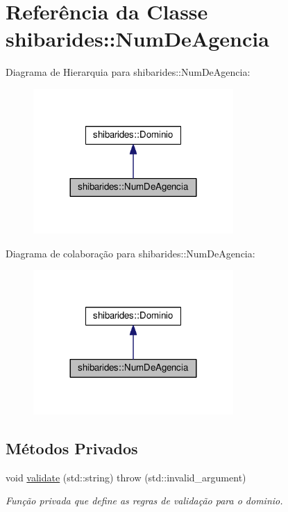 \hypertarget{classshibarides_1_1NumDeAgencia}{}\section{Referência da Classe shibarides\+:\+:Num\+De\+Agencia}
\label{classshibarides_1_1NumDeAgencia}


Diagrama de Hierarquia para shibarides\+:\+:Num\+De\+Agencia\+:\nopagebreak
\begin{figure}[H]
\begin{center}
\leavevmode
\includegraphics[width=216pt]{classshibarides_1_1NumDeAgencia__inherit__graph}
\end{center}
\end{figure}


Diagrama de colaboração para shibarides\+:\+:Num\+De\+Agencia\+:\nopagebreak
\begin{figure}[H]
\begin{center}
\leavevmode
\includegraphics[width=216pt]{classshibarides_1_1NumDeAgencia__coll__graph}
\end{center}
\end{figure}
\subsection*{Métodos Privados}
\begin{DoxyCompactItemize}
\item 
void \hyperlink{classshibarides_1_1NumDeAgencia_a4bf7dd9204aff60838faf4f2362d8c3b}{validate} (std\+::string)  throw (std\+::invalid\+\_\+argument)
\begin{DoxyCompactList}\small\item\em Função privada que define as regras de validação para o dominio. \end{DoxyCompactList}\end{DoxyCompactItemize}
